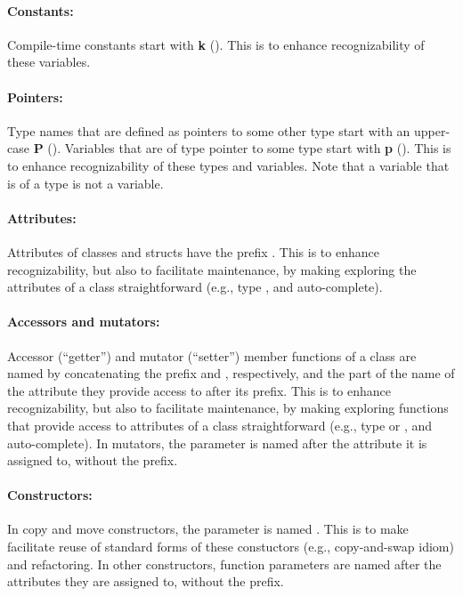 \documentclass[footinclude=false,11pt,DIV11]{scrartcl}
\begin{document}
\paragraph{Constants:} Compile-time constants start with \textbf{k} (\ktype). 
This is to enhance recognizability of these variables.

\paragraph{Pointers:} Type names that are defined as pointers to some other type start
with an upper-case \textbf{P} (\Ptype). Variables that are of type pointer to 
some type start with \textbf{p} (\ptype). This is to enhance recognizability of 
these types and variables. Note that a variable that is of a \Ptype type is not 
a \ptype variable.

\paragraph{Attributes:} Attributes of classes and structs have the prefix .
This is to enhance recognizability, but also to facilitate maintenance, by making
exploring the attributes of a class straightforward (e.g., type , and
auto-complete).

\paragraph{Accessors and mutators:} Accessor (``getter'') and mutator (``setter'')
member functions of a class are named by concatenating the prefix  and
, respectively, and the part of the name of the attribute they provide
access to after its  prefix. This is to enhance recognizability, but also to
facilitate maintenance, by making exploring functions that provide access to attributes
of a class straightforward (e.g., type  or , and
auto-complete). In mutators, the parameter is named after the attribute it is assigned
to, without the  prefix.

\paragraph{Constructors:} In copy and move constructors, the parameter is named 
. This is to make facilitate reuse of standard forms of these 
constuctors (e.g., copy-and-swap idiom) and refactoring. In other constructors, 
function parameters are named after the attributes they are assigned to, without 
the  prefix.
\end{document}
